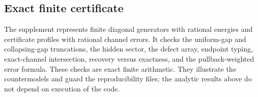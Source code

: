 \subsection{Exact finite certificate}

The supplement represents finite diagonal generators with rational energies
and certificate profiles with rational channel errors.  It checks the
uniform-gap and collapsing-gap truncations, the hidden sector, the defect
array, endpoint typing, exact-channel intersection, recovery versus
exactness, and the pullback-weighted error formula.  These checks are exact
finite arithmetic.  They illustrate the countermodels and guard the
reproducibility files; the analytic results above do not depend on execution
of the code.
